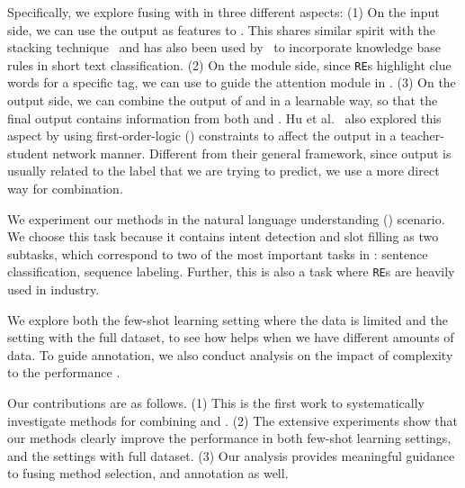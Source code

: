 

Specifically, we explore fusing \RE with \NN in three different aspects: (1) On the \NN input side, we can use the \RE output as features
to \NN. This shares similar spirit with the stacking technique~\cite{wolpert1992stacked} and has also been used by~\cite{wang2017combining}
to incorporate knowledge base rules in short text classification.
(2) On the \NN module side, since \texttt{RE}s highlight clue words for a
specific tag, we can use \RE to guide the attention module in \NN. (3) On the \NN output side, we can combine the output of \RE and \NN in
a learnable way, so that the final output contains information from both \NN and \RE. Hu et al.~ also explored
this aspect by using first-order-logic (\FOL) constraints to affect the \NN output in a teacher-student network manner. Different from
their general framework, since \RE output is usually related to the label that we are trying to predict, we use a more direct way for
combination.

We experiment our methods in the natural language understanding (\NLU) scenario. We choose this task because it contains intent detection
and slot filling as two subtasks, which correspond to two of the most important tasks in \NLP: sentence classification, sequence labeling.
Further, this is also a task where \texttt{RE}s are heavily used in industry.

We explore both the few-shot learning setting where the data is limited and the setting with the full dataset, to see how \RE helps when we have different amounts of data.
To guide \RE annotation, we also conduct analysis on the impact of \RE complexity to the performance \NN.

Our contributions are as follows. (1) This is the first work to systematically investigate methods for combining \RE and \NN. (2) The
extensive experiments show that our methods clearly improve the \NN performance in both few-shot learning settings, and the settings with
full dataset. (3) Our analysis provides meaningful guidance to fusing method selection, and \RE annotation as well.
